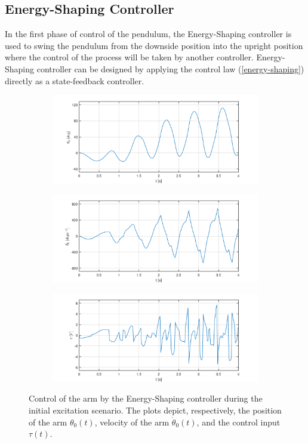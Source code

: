 \subsection{Energy-Shaping Controller}
In the first phase of control of the pendulum, the Energy-Shaping controller is used to swing the pendulum from the downside position into the upright position where the control of the process will be taken by another controller. 
Energy-Shaping controller can be designed by applying the control law (\ref{energy-shaping}) directly as a state-feedback controller.
\begin{figure}[H]
	\centering
\begin{subfigure}
	\centering
	\includegraphics[scale=0.6]{images/swings/arm.pdf}  
\end{subfigure}
\begin{subfigure}
	\centering
	\includegraphics[scale=0.6]{images/swings/darm.pdf}  
\end{subfigure}
\begin{subfigure}
	\centering
	\includegraphics[scale=0.6]{images/swings/control.pdf}  
\end{subfigure}
	\caption{Control of the arm by the Energy-Shaping controller during the initial excitation scenario. The plots depict, respectively, the position of the arm $\theta_0(t)$, velocity of the arm $\dot{\theta}_0(t)$, and the control input $\tau(t)$.}
\label{swing}
\end{figure}
